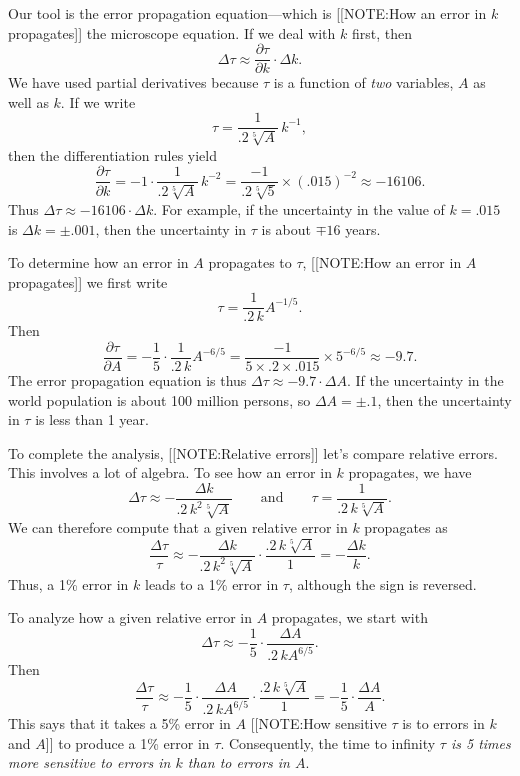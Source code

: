 	Our tool is the error propagation equation---which is 
	[[NOTE:How an error in $k$ propagates]]
the microscope equation.  If we deal with $k$ first, then
	\[
\Delta \tau \approx \dfrac{\partial \tau}{\partial k}
		\cdot \Delta k.
\]
We have used partial derivatives because $\tau$ is a function of {\em two\/} variables, $A$ as well as $k$.  If we write
	\[
\tau = \dfrac{1}{.2\sqrt[5]{A}} \, k^{-1},
\]
then the differentiation rules yield
	\[
\dfrac{\partial \tau}{\partial k} = -1 \cdot 
		\dfrac{1}{.2\sqrt[5]{A}} \, k^{-2} = 
		\dfrac{-1}{.2\sqrt[5]{5}} \times (.015)^{-2} 
		\approx -16106.
\]
Thus $\Delta \tau \approx -16106 \cdot \Delta k$.  For example, if the uncertainty in the value of $k = .015$ is $\Delta k = \pm .001$, then the uncertainty in $\tau$ is about $\mp 16$ years.

	To determine how an error in $A$ propagates to $\tau$, 
	[[NOTE:How an error in $A$ propagates]]
we first write
	\[
\tau = \dfrac{1}{.2\,k} A^{-1/5}.
\]
Then
	\[
\dfrac{\partial \tau}{\partial A} = 
		-\dfrac{1}{5} \cdot \dfrac{1}{.2\,k} A^{-6/5} = 
		\dfrac{-1}{5 \times.2 \times .015} \times 5^{-6/5} 
		\approx -9.7.
\]
The error propagation equation is thus $\Delta \tau \approx -9.7 \cdot \Delta A$.  If the uncertainty in the world population is about 100 million persons, so $\Delta A = \pm .1$, then the uncertainty in $\tau$ is less than 1 year.

	To complete the analysis, 
	[[NOTE:Relative errors]]
let's compare relative errors.  This involves a lot of algebra.  To see how an error in $k$ propagates, we have
	\[
\Delta \tau \approx -\dfrac{\Delta k}{.2\,k^2\sqrt[5]{A}}
		\qquad \mbox{and} \qquad 
		\tau = \dfrac{1}{.2\,k\sqrt[5]{A}}.
\]
We can therefore compute that a given relative error in $k$ propagates as 
	\[
\dfrac{\Delta \tau}{\tau} \approx 
		-\dfrac{\Delta k}{.2\,k^2\sqrt[5]{A}} \cdot
			\dfrac{.2\,k\sqrt[5]{A}}{1} 
		= -\dfrac{\Delta k}{k}.
\]
Thus, a 1\% error in $k$ leads to a 1\% error in $\tau$, although the sign is reversed.

	To analyze how a given relative error in $A$ propagates, we start with
	\[
\Delta \tau \approx -\dfrac{1}{5} \cdot
		\dfrac{\Delta A}{.2\,k A^{6/5}}.
\]
Then
	\[
\dfrac{\Delta \tau}{\tau} \approx -\dfrac{1}{5} \cdot
		\dfrac{\Delta A}{.2\,k A^{6/5}} \cdot
			\dfrac{.2\,k\sqrt[5]{A}}{1} =
		-\dfrac{1}{5} \cdot \dfrac{\Delta A}{A}.
\]
This says that it takes a 5\% error in $A$ 
	[[NOTE:How sensitive $\tau$ is to errors in $k$ and $A$]]
to produce a 1\% error in $\tau$.  Consequently, the time to infinity {\em $\tau$ is 5 times more sensitive to errors in $k$ than to errors in $A$}.
\label{supergrowth errors-end}




